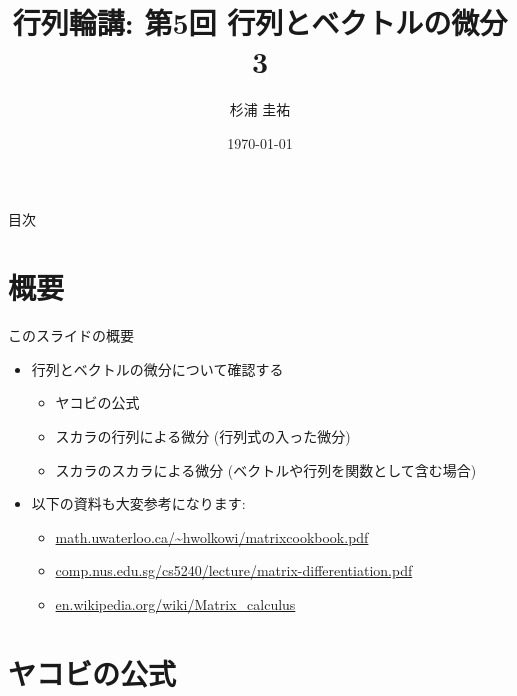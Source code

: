 \documentclass[dvipdfmx,notheorems,t]{beamer}
\title{行列輪講: 第5回 行列とベクトルの微分3}
\author{杉浦 圭祐}
\institute[松谷研究室]{慶應義塾大学理工学部情報工学科 松谷研究室}
\date{\today}
\begin{document}
\linespread{1.1}

\frame{\titlepage}

\section{}

\begin{frame}{目次}
\tableofcontents
\end{frame}

\section{概要}

\begin{frame}{このスライドの概要}
\begin{itemize}
  \item 行列とベクトルの微分について確認する
  \begin{itemize}
    \item ヤコビの公式
    \item スカラの行列による微分 (行列式の入った微分)
    \item スカラのスカラによる微分 (ベクトルや行列を関数として含む場合)
  \end{itemize}
  \item 以下の資料も大変参考になります:
  \begin{itemize}
    \item \url{math.uwaterloo.ca/~hwolkowi/matrixcookbook.pdf}
    \item \url{comp.nus.edu.sg/cs5240/lecture/matrix-differentiation.pdf}
    \item \url{en.wikipedia.org/wiki/Matrix_calculus}
  \end{itemize}
\end{itemize}
\end{frame}

\section{ヤコビの公式}
\end{document}
